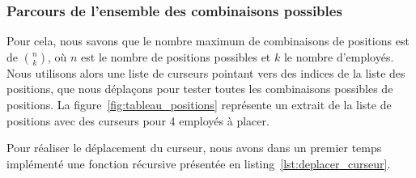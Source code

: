 \subsubsection{Parcours de l'ensemble des combinaisons possibles}
Pour cela, nous savons que le nombre maximum de combinaisons de positions est de \(\binom{n}{k}\), où \(n\) est le nombre de positions possibles et \(k\) le nombre d'employés. Nous utilisons alors une liste de curseurs pointant vers des indices de la liste des positions, que nous déplaçons pour tester toutes les combinaisons possibles de positions. La figure~\ref{fig:tableau_positions} représente un extrait de la liste de positions avec des curseurs pour 4 employés à placer.

\begin{center}
    \label{fig:tableau_positions}
\end{center}

Pour réaliser le déplacement du curseur, nous avons dans un premier temps implémenté une fonction récursive présentée en listing~\ref{lst:deplacer_curseur}.\\

